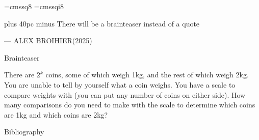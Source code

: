 \documentclass[aspectratio=169, handout]{beamer}
\begin{document}
\font\eightss=cmssq8
\font\eightssi=cmssqi8
\newcommand\quoteAuthorDate[3]{\begingroup
  \baselineskip 10pt
  \parfillskip 0pt
  \interlinepenalty 10000 %
  \leftskip 0pt plus 40pc minus \parindent
  \let\rm=\eightss
  \let\sl=\eightssi
  \everypar{\sl}#1\par
  \nobreak\smallskip
  \noindent\rm--- #2\unskip\enspace(#3)\par
  \endgroup}
\begin{frame}
    \begin{center}
        \item \quoteAuthorDate{There will be a brainteaser instead of a quote}{ALEX BROIHIER}{\textcolor{sigma@mainblue}{2025}}
    \end{center}
\end{frame}

\begin{frame}{Brainteaser}
    \begin{center}
        \item There are $2^k$ coins, some of which weigh 1kg, and the rest of which weigh 2kg. You are unable to tell by yourself what a coin weighs. You have a scale to compare weights with (you can put any number of coins on either side). How many comparisons do you need to make with the scale to determine which coins are 1kg and which coins are 2kg?
    \end{center}
\end{frame}

\begin{frame}[allowframebreaks]{Bibliography}
    \tiny
    
    
\end{frame}
\end{document}
